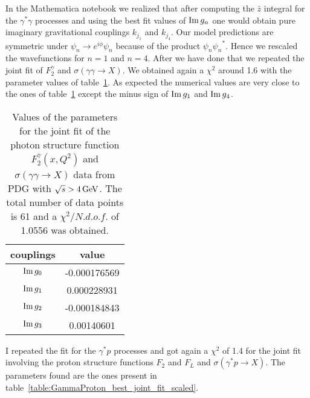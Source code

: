 \documentclass[preprint, 12pt]{elsarticle}
\begin{document}
In the Mathematica notebook we realized that after computing the $\bar{z}$ integral for the $\gamma^{*} \gamma$ processes and using the best fit values of ${\rm Im} \, g_n$ one would obtain pure imaginary gravitational couplings $k_{j_1}$ and $k_{j_4}$. Our model predictions are symmetric under $\psi_n \rightarrow e^{i\phi} \psi_n$ because of the product $\psi_n {\psi_n}^*$. Hence we rescaled the wavefunctions for $n=1$ and $n=4$. After we have done that we repeated the joint fit of $F_2^\gamma$ and $\sigma\left(\gamma \gamma \rightarrow X\right)$. We obtained again a $\chi^2$ around 1.6 with the parameter values of table~\ref{table:GammaGamma_best_joint_fit_scaled}. As expected the numerical values are very close to the ones of table~\ref{table:GammaGamma_best_joint_fit_scaled} except the minus sign of ${\rm Im} \, g_1$ and ${\rm Im} \, g_4$. 
\begin{table}[b!]
\centering
\caption{Values of the parameters for the joint fit of the photon structure function $F_2^{\gamma}\left(x, Q^2\right)$ and $\sigma\left(\gamma \gamma \rightarrow X\right)$ data from PDG with $\sqrt{s} > 4 {\rm \, GeV}$. The total number of data points is 61 and a $\chi^2 / {N.d.o.f.}$ of 1.0556 was obtained.}
\vspace{0.5cm}
\begin{tabular}{|c|c|}
\hline
couplings   & value \\
\hline
${\rm Im} \, g_0$  & -0.000176569\\ 
\hline
${\rm Im} \, g_1$  & 0.000228931 \\ 
\hline
${\rm Im} \, g_2$  & -0.000184843 \\
\hline
${\rm Im} \, g_3$  & 0.00140601 \\ 
\hline
\end{tabular}
\label{table:GammaGamma_best_joint_fit_scaled}
\end{table}
I repeated the fit for the $\gamma^{*}p$ processes and got again a $\chi^2$ of 1.4 for the joint fit involving the proton structure functions $F_2$ and $F_L$ and $\sigma\left(\gamma^* p \rightarrow X\right)$. The parameters found are the ones present in table~\ref{table:GammaProton_best_joint_fit_scaled}.
\end{document}
